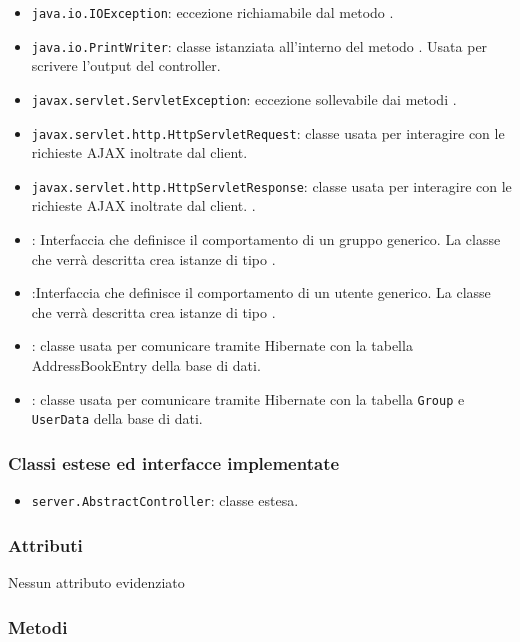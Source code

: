\begin{itemize}
	\item \texttt{java.io.IOException}: eccezione richiamabile dal metodo .
	\item \texttt{java.io.PrintWriter}: classe istanziata all'interno del metodo . Usata per scrivere l'output del controller.
	\item \texttt{javax.servlet.ServletException}: eccezione sollevabile dai metodi .
	\item \texttt{javax.servlet.http.HttpServletRequest}: classe usata per interagire con le richieste AJAX inoltrate dal client.
	\item \texttt{javax.servlet.http.HttpServletResponse}: classe usata per interagire con le richieste AJAX inoltrate dal client. .
	\item {}:
Interfaccia che definisce il comportamento di un gruppo generico. La classe che verrà descritta crea istanze di tipo .
	\item {}:Interfaccia che definisce il comportamento di un utente generico. La classe che verrà descritta crea istanze di tipo .
	\item {}: classe usata per comunicare tramite Hibernate con la tabella AddressBookEntry della base di dati.
	\item {}: classe usata per comunicare tramite Hibernate con la tabella \texttt{Group} e \texttt{UserData} della base di dati.
\end{itemize}

\subsubsection*{Classi estese ed interfacce implementate}
\begin{itemize}
	\item \texttt{server.AbstractController}: classe estesa.
\end{itemize}

\subsubsection*{Attributi}

Nessun attributo evidenziato


\subsubsection*{Metodi}

